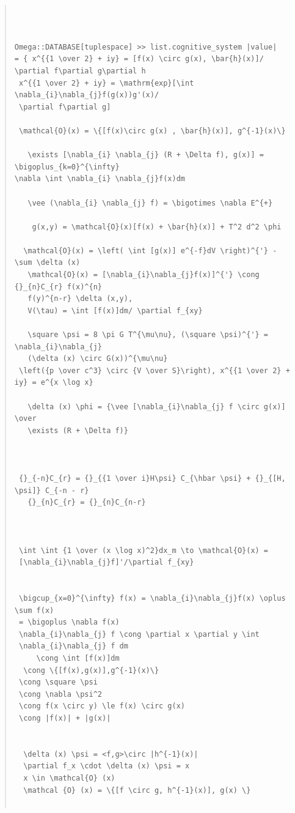 \documentclass{jsarticle}
\begin{document}
{\begin{quote}
\setlength{\baselineskip}{12pt}
\begin{verbatim}



Omega::DATABASE[tuplespace] >> list.cognitive_system |value| 
= { x^{{1 \over 2} + iy} = [f(x) \circ g(x), \bar{h}(x)]/ \partial f\partial g\partial h 
 x^{{1 \over 2} + iy} = \mathrm{exp}[\int \nabla_{i}\nabla_{j}f(g(x))g'(x)/
 \partial f\partial g] 

 \mathcal{O}(x) = \{[f(x)\circ g(x) , \bar{h}(x)], g^{-1}(x)\} 

   \exists [\nabla_{i} \nabla_{j} (R + \Delta f), g(x)] = \bigoplus_{k=0}^{\infty}
\nabla \int \nabla_{i} \nabla_{j}f(x)dm 

   \vee (\nabla_{i} \nabla_{j} f) = \bigotimes \nabla E^{+} 

    g(x,y) = \mathcal{O}(x)[f(x) + \bar{h}(x)] + T^2 d^2 \phi 

  \mathcal{O}(x) = \left( \int [g(x)] e^{-f}dV \right)^{'} - \sum \delta (x) 
   \mathcal{O}(x) = [\nabla_{i}\nabla_{j}f(x)]^{'} \cong {}_{n}C_{r} f(x)^{n} 
   f(y)^{n-r} \delta (x,y), 
   V(\tau) = \int [f(x)]dm/ \partial f_{xy} 

   \square \psi = 8 \pi G T^{\mu\nu}, (\square \psi)^{'} = \nabla_{i}\nabla_{j}
   (\delta (x) \circ G(x))^{\mu\nu}
 \left({p \over c^3} \circ {V \over S}\right), x^{{1 \over 2} + iy} = e^{x \log x} 

   \delta (x) \phi = {\vee [\nabla_{i}\nabla_{j} f \circ g(x)] \over 
   \exists (R + \Delta f)} 



 {}_{-n}C_{r} = {}_{{1 \over i}H\psi} C_{\hbar \psi} + {}_{[H, \psi]} C_{-n - r} 
   {}_{n}C_{r} = {}_{n}C_{n-r} 



 \int \int {1 \over (x \log x)^2}dx_m \to \mathcal{O}(x) = 
 [\nabla_{i}\nabla_{j}f]'/\partial f_{xy}


 \bigcup_{x=0}^{\infty} f(x) = \nabla_{i}\nabla_{j}f(x) \oplus \sum f(x) 
 = \bigoplus \nabla f(x) 
 \nabla_{i}\nabla_{j} f \cong \partial x \partial y \int 
 \nabla_{i}\nabla_{j} f dm 
     \cong \int [f(x)]dm 
  \cong \{[f(x),g(x)],g^{-1}(x)\} 
 \cong \square \psi  
 \cong \nabla \psi^2 
 \cong f(x \circ y) \le f(x) \circ g(x)
 \cong |f(x)| + |g(x)| 


  \delta (x) \psi = <f,g>\circ |h^{-1}(x)| 
  \partial f_x \cdot \delta (x) \psi = x 
  x \in \mathcal{O} (x) 
  \mathcal {O} (x) = \{[f \circ g, h^{-1}(x)], g(x) \} 


\end{verbatim}
\end{quote}}
\end{document}
